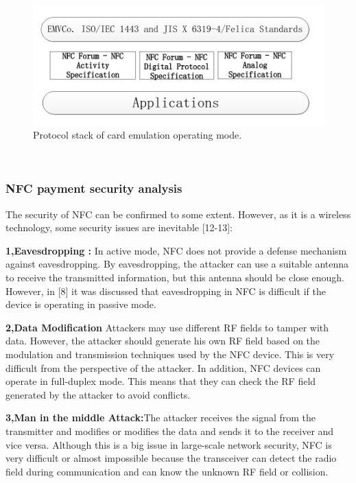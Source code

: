\documentclass[journal]{IEEEtran}
\begin{document}
\begin{figure}[htbp]
\centerline{\includegraphics[scale=0.28]{Protocol_emulation.png}}
\caption{Protocol stack of card emulation operating mode.}
\label{fig}
\end{figure}

\

\subsubsection{NFC payment security analysis}

The security of NFC can be confirmed to some extent. However, as it is a wireless technology, some security issues are inevitable [12-13]:

\textbf{1,Eavesdropping :} In active mode, NFC does not provide a defense mechanism against eavesdropping. By eavesdropping, the attacker can use a suitable antenna to receive the transmitted information, but this antenna should be close enough. However, in [8] it was discussed that eavesdropping in NFC is difficult if the device is operating in passive mode.

\textbf{2,Data Modification}
Attackers may use different RF fields to tamper with data. However, the attacker should generate his own RF field based on the modulation and transmission techniques used by the NFC device. This is very difficult from the perspective of the attacker. In addition, NFC devices can operate in full-duplex mode. This means that they can check the RF field generated by the attacker to avoid conflicts.

\textbf{3,Man in the middle Attack:}The attacker receives the signal from the transmitter and modifies or modifies the data and sends it to the receiver and vice versa. Although this is a big issue in large-scale network security, NFC is very difficult or almost impossible because the transceiver can detect the radio field during communication and can know the unknown RF field or collision.
\end{document}
